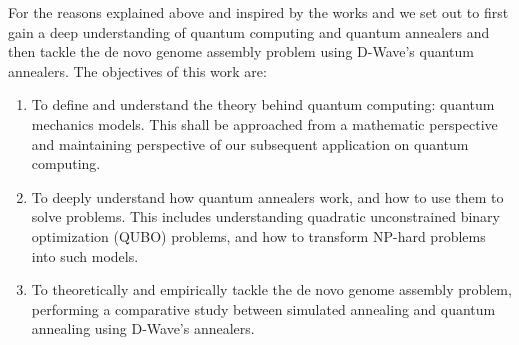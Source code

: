 For the reasons explained above and inspired by the works \cite{Sohn2018} and \cite{Sarkar2020}  we set out to first gain a deep understanding of quantum computing and quantum annealers and then tackle the de novo genome assembly problem using D-Wave's quantum annealers. The objectives of this work are:

\begin{enumerate}
	\item To define and understand the theory behind quantum computing: quantum mechanics models. This shall be approached from a mathematic perspective and maintaining perspective of our subsequent application on quantum computing.
	
	\item To deeply understand how quantum annealers work, and how to use them to solve problems. This includes understanding quadratic unconstrained binary optimization (QUBO) problems, and how to transform NP-hard problems into such models.
	
	\item To theoretically and empirically tackle the de novo genome assembly problem, performing a comparative study between simulated annealing and quantum annealing using D-Wave's annealers.
\end{enumerate}

